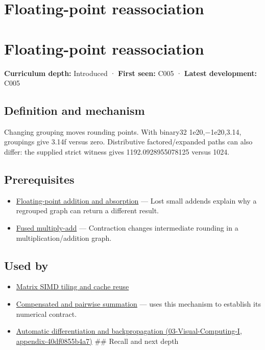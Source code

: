 \hypertarget{appendix-c2ac4a84c283}{}
\section*{Floating-point reassociation}
\section{Floating-point reassociation}\label{appendix-c2ac4a84c283-floating-point-reassociation}

\textbf{Curriculum depth:} Introduced · \textbf{First seen:} C005 · \textbf{Latest development:} C005

\subsection{Definition and mechanism}\label{appendix-c2ac4a84c283-definition-and-mechanism}

Changing grouping moves rounding points. With binary32 1e20,−1e20,3.14, groupings give 3.14f versus zero. Distributive factored/expanded paths can also differ: the supplied strict witness gives 1192.0928955078125 versus 1024.

\subsection{Prerequisites}\label{appendix-c2ac4a84c283-prerequisites}

\begin{itemize}
\tightlist
\item
  \hyperref[appendix-a1b1b4580dfd]{Floating-point addition and absorption} --- Lost small addends explain why a regrouped graph can return a different result.
\item
  \hyperref[appendix-41e8ef22a21e]{Fused multiply-add} --- Contraction changes intermediate rounding in a multiplication/addition graph.
\end{itemize}

\subsection{Used by}\label{appendix-c2ac4a84c283-used-by}

\begin{itemize}
\item
  \hyperref[appendix-1bfb7c657105]{Matrix SIMD tiling and cache reuse}
\item
  \hyperref[appendix-df318da57389]{Compensated and pairwise summation} --- uses this mechanism to establish its numerical contract.
\item
  \href{../03-Visual-Computing-I/main.pdf\#nameddest=appendix-40df0855b4a7}{Automatic differentiation and backpropagation (03-Visual-Computing-I, appendix-40df0855b4a7)} \#\# Recall and next depth
\end{itemize}

